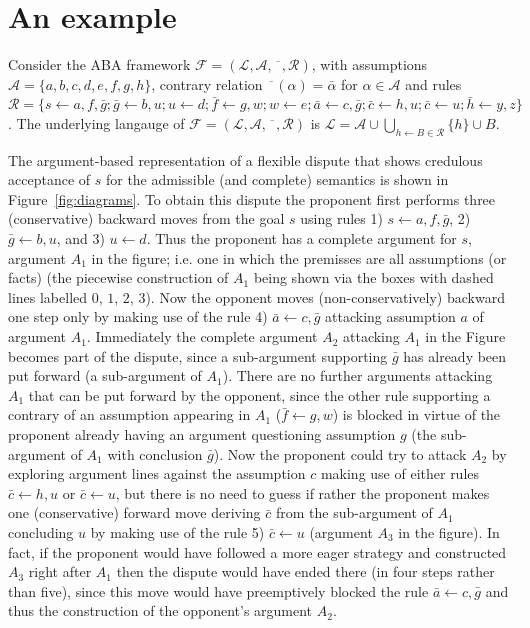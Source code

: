 \documentclass[conference]{IEEEtran}
\newtheorem{example}{Example}[section]
\newcommand{\frF}{\ensuremath{\mathcal{F}}\xspace}
\newcommand{\frL}{\ensuremath{\mathcal{L}}\xspace}
\newcommand{\frA}{\ensuremath{\mathcal{A}}\xspace}
\newcommand{\frCtr}{\ensuremath{\overline{\phantom{x}}}\xspace}
\newcommand{\frR}{\ensuremath{\mathcal{R}}\xspace}
\newcommand{\frTup}{\ensuremath{(\frL,\frA,\frCtr,\frR)}\xspace}
\newcommand{\fr}{\ensuremath{\frF = \frTup}\xspace}
\newcommand{\rulH}{\ensuremath{h}\xspace}
\newcommand{\rulB}{\ensuremath{B}\xspace}
\newcommand{\rul}{\ensuremath{\rulH \leftarrow \rulB}\xspace}
\newcommand{\rulA}[2]{\ensuremath{#1 \leftarrow #2}\xspace}
\begin{document}
\section{An example}



Consider the ABA framework \fr, with assumptions $\frA = \{ a,b,c,d,e,f,g,h \}$, contrary relation $\frCtr(\alpha) = \bar{\alpha}$ for $\alpha \in \frA$ and rules $\frR = \{ \rulA{s}{a,f,\bar{g}}; \rulA{\bar{g}}{b,u}; \rulA{u}{d}; \rulA{\bar{f}}{g,w}; \rulA{w}{e};\rulA{\bar{a}}{c,\bar{g}};\rulA{\bar{c}}{h,u};\rulA{\bar{c}}{u};\rulA{\bar{h}}{y,z} \}$.  The underlying langauge of \fr is $\frL = \frA \cup \bigcup_{\rul \in \frR} \{ \rulH \} \cup \rulB$. 

The argument-based representation of a flexible dispute that shows credulous acceptance of $s$ for the admissible (and complete) semantics is shown in Figure~\ref{fig:diagrams}. To obtain this dispute the proponent first performs three (conservative) backward moves from the goal $s$ using rules 1) $\rulA{s}{a,f,\bar{g}}$, 2) $\rulA{\bar{g}}{b,u}$, and  3) $\rulA{u}{d}$. Thus the proponent has a complete argument for $s$, argument $A_1$ in the figure; i.e. one in which the premisses are all assumptions (or facts) (the piecewise construction of $A_1$ being shown via the boxes with dashed lines labelled $0$, $1$, $2$, $3$).  Now the opponent moves (non-conservatively) backward one step only by making use of the rule 4) $\rulA{\bar{a}}{c,\bar{g}}$ attacking assumption $a$ of argument $A_1$.  Immediately the complete argument $A_2$ attacking $A_1$ in the Figure becomes part of the dispute, since a sub-argument supporting $\bar{g}$ has already been put forward (a sub-argument of $A_1$).  There are no further arguments attacking $A_1$ that can be put forward by the opponent, since the other rule supporting a contrary of an assumption appearing in $A_1$ ($\rulA{\bar{f}}{g,w}$) is blocked in virtue of the proponent already having an argument questioning assumption $g$ (the sub-argument of $A_1$ with conclusion $\bar{g}$).  Now the proponent could try to attack $A_2$ by exploring argument lines against the assumption $c$ making use of either rules $\rulA{\bar{c}}{h,u}$ or $\rulA{\bar{c}}{u}$, but there is no need to guess if rather the proponent makes one (conservative) forward move deriving $\bar{c}$ from the sub-argument of $A_1$ concluding $u$ by making use of the rule 5) $\rulA{\bar{c}}{u}$ (argument $A_3$ in the figure). In fact, if the proponent would have followed a more eager strategy and constructed $A_3$ right after $A_1$ then the dispute would have ended there (in four steps rather than five), since this move would have preemptively blocked the rule $\rulA{\bar{a}}{c,\bar{g}}$ and thus the construction of the opponent's argument $A_2$.   
\end{document}
